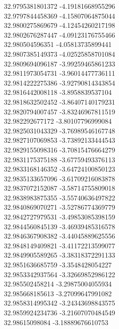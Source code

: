 {32.9795381801372	-4.19181668955296\\
32.9797844458369	-4.15807064875044\\
32.9800275869679	-4.12454260217198\\
32.9802676287447	-4.09123176755466\\
32.980504596351	-4.05813735899441\\
32.9807385149373	-4.02525858701084\\
32.9809694096187	-3.99259465861233\\
32.9811973054731	-3.96014477736111\\
32.9814222275386	-3.92790814343854\\
32.9816442008118	-3.8958839537104\\
32.9818632502452	-3.86407140179231\\
32.9820794007457	-3.83246967811519\\
32.982292677172	-3.80107796999084\\
32.9825031043329	-3.76989546167748\\
32.9827107069853	-3.73892133444543\\
32.9829155098316	-3.70815476664279\\
32.9831175375188	-3.67759493376113\\
32.9833168146352	-3.64724100850123\\
32.9835133657096	-3.61709216083878\\
32.9837072152087	-3.58714755809018\\
32.9838983875355	-3.55740636497822\\
32.9840869070271	-3.52786774369779\\
32.9842727979531	-3.49853085398159\\
32.9844560845139	-3.46939485316578\\
32.9846367908382	-3.44045889625556\\
32.9848149409821	-3.41172213599077\\
32.9849905589265	-3.38318372291133\\
32.9851636685759	-3.3548428054227\\
32.9853342937564	-3.32669852986122\\
32.985502458214	-3.29875004055934\\
32.985668185613	-3.27099647991082\\
32.9858314995342	-3.24343698843575\\
32.9859924234736	-3.21607070484549\\
32.98615098084	-3.18889676610753\\
}
